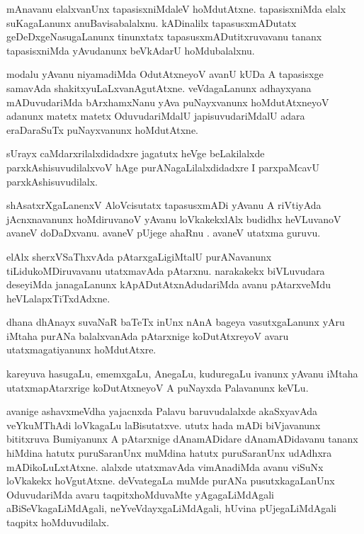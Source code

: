 \documentclass{article}
\begin{document}
\begin{mn}%
mAnavanu elalxvanUnx tapasisxniMdaleV hoMdutAtxne. tapasisxniMda elalx suKagaLanunx 
anuBavisabalalxnu. kADinalilx tapasusxmADutatx geDeDxgeNasugaLanunx tinunxtatx 
tapasusxmADutitxruvavanu tananx tapasisxniMda yAvudanunx beVkAdarU hoMdubalalxnu.
\end{mn}

\begin{mn}%
modalu yAvanu niyamadiMda OdutAtxneyoV avanU kUDa A tapasisxge samavAda shakitxyuLaLxvanAgutAtxne. 
veVdagaLanunx adhayxyana mADuvudariMda bArxhamxNanu yAva puNayxvanunx hoMdutAtxneyoV adanunx matetx 
matetx OduvudariMdalU japisuvudariMdalU adara eraDaraSuTx puNayxvanunx hoMdutAtxne.
\end{mn}

\begin{mn}%
sUrayx caMdarxrilalxdidadxre jagatutx heVge beLakilalxde parxkAshisuvudilalxvoV hAge 
purANagaLilalxdidadxre I parxpaMcavU parxkAshisuvudilalx.
\end{mn}

\begin{mn}%
shAsatxrXgaLanenxV AloVcisutatx tapasusxmADi yAvanu A riVtiyAda jAcnxnavanunx hoMdiruvanoV yAvanu 
loVkakekxlAlx budidhx heVLuvanoV avaneV doDaDxvanu. avaneV pUjege ahaRnu . avaneV utatxma guruvu.
\end{mn}

\begin{mn}%
elAlx sherxVSaThxvAda pAtarxgaLigiMtalU purANavanunx tiLidukoMDiruvavanu utatxmavAda pAtarxnu. 
narakakekx biVLuvudara deseyiMda janagaLanunx kApADutAtxnAdudariMda avanu pAtarxveMdu 
heVLalapxTiTxdAdxne.
\end{mn}

\begin{mn}%
dhana dhAnayx suvaNaR baTeTx inUnx nAnA bageya vasutxgaLanunx yAru iMtaha purANa balalxvanAda 
pAtarxnige koDutAtxreyoV avaru utatxmagatiyanunx hoMdutAtxre.
\end{mn}

\begin{mn}%
kareyuva hasugaLu, ememxgaLu, AnegaLu, kuduregaLu ivanunx yAvanu iMtaha utatxmapAtarxrige 
koDutAtxneyoV A puNayxda Palavanunx keVLu.
\end{mn}

\begin{mn}%
avanige ashavxmeVdha yajacnxda Palavu baruvudalalxde akaSxyavAda veYkuMThAdi loVkagaLu laBisutatxve. 
ututx hada mADi biVjavanunx bititxruva Bumiyanunx A pAtarxnige dAnamADidare dAnamADidavanu tananx 
hiMdina hatutx puruSaranUnx muMdina hatutx puruSaranUnx udAdhxra mADikoLuLxtAtxne. alalxde 
utatxmavAda vimAnadiMda avanu viSuNx loVkakekx hoVgutAtxne. deVvategaLa muMde purANa 
pusutxkagaLanUnx OduvudariMda avaru taqpitxhoMduvaMte yAgagaLiMdAgali aBiSeVkagaLiMdAgali, 
neYveVdayxgaLiMdAgali, hUvina pUjegaLiMdAgali taqpitx hoMduvudilalx.
\end{mn}
\end{document}
